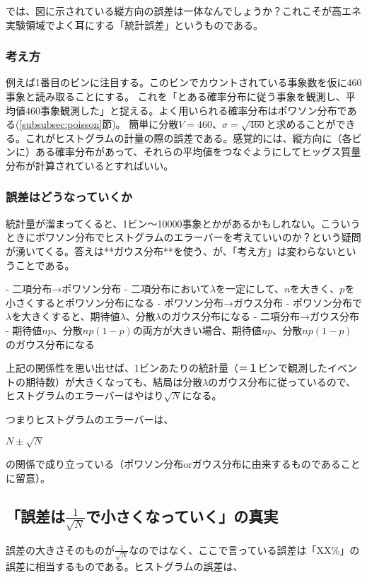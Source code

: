 では、図に示されている縦方向の誤差は一体なんでしょうか？これこそが高エネ実験領域でよく耳にする「統計誤差」というものである。

\subsubsection{考え方}
例えば1番目のビンに注目する。このビンでカウントされている事象数を仮に460事象と読み取ることにする。
これを「とある確率分布に従う事象を観測し、平均値460事象観測した」と捉える。よく用いられる確率分布はポワソン分布である(\ref{subsubsec:poisson}節)。
簡単に分散$V=460$、$\sigma=\sqrt{460}$と求めることができる。これがヒストグラムの計量の際の誤差である。感覚的には、縦方向に（各ビンに）ある確率分布があって、それらの平均値をつなぐようにしてヒッグス質量分布が計算されているとすればいい。

\subsubsection{誤差はどうなっていくか}
統計量が溜まってくると、1ビン〜10000事象とかがあるかもしれない。こういうときにポワソン分布でヒストグラムのエラーバーを考えていいのか？という疑問が湧いてくる。答えは**ガウス分布**を使う、が、「考え方」は変わらないということである。

- 二項分布→ポワソン分布
- 二項分布において$\lambda$を一定にして、$n$を大きく、$p$を小さくするとポワソン分布になる
- ポワソン分布→ガウス分布
- ポワソン分布で$\lambda$を大きくすると、期待値$\lambda$、分散$\lambda$のガウス分布になる
- 二項分布→ガウス分布
- 期待値$np$、分散$np(1-p)$の両方が大きい場合、期待値$np$、$分散np(1-p)$のガウス分布になる

上記の関係性を思い出せば、1ビンあたりの統計量（＝１ビンで観測したイベントの期待数）が大きくなっても、結局は分散$\lambda$のガウス分布に従っているので、ヒストグラムのエラーバーはやはり$\sqrt{N}$になる。

つまりヒストグラムのエラーバーは、

$N\pm\sqrt{N}$

の関係で成り立っている（ポワソン分布orガウス分布に由来するものであることに留意）。


\subsection{「誤差は$\frac{1}{\sqrt{N}}$で小さくなっていく」の真実}
誤差の大きさそのものが$\frac{1}{\sqrt{N}}$なのではなく、ここで言っている誤差は「XX\%」の誤差に相当するものである。ヒストグラムの誤差は、

